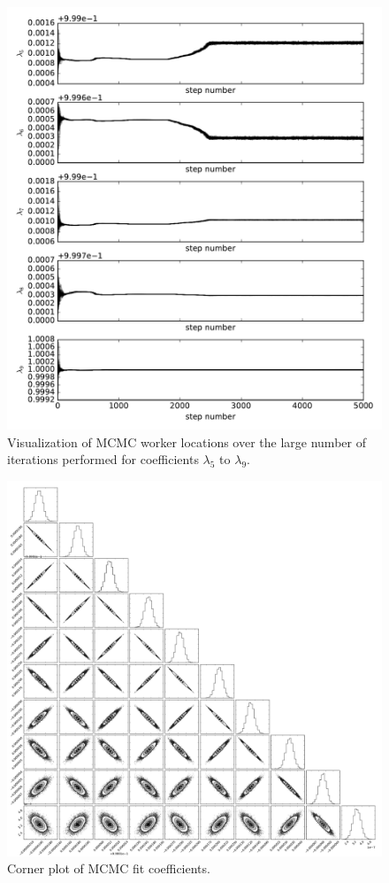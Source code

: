 \begin{figure}[ht]
  \includegraphics[width=\textwidth]{img/line-time-2.pdf}
  \caption{Visualization of MCMC worker locations over the large number of iterations performed for coefficients $\lambda_5$ to $\lambda_9$.}
  \label{fig:MCMC_time}
\end{figure}

\begin{figure}[ht]
  \includegraphics[width=\textwidth]{img/line-triangle.pdf}
  \caption{Corner plot of MCMC fit coefficients.}
  \label{fig:MCMC_triangle}
\end{figure}

